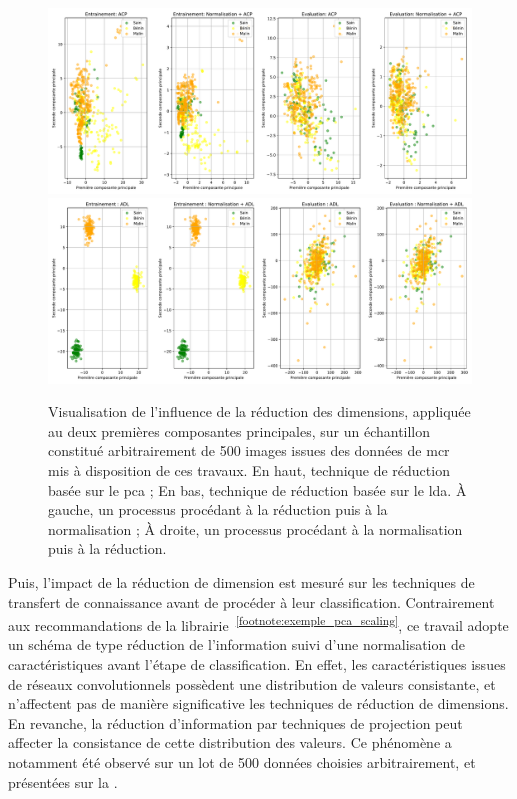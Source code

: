 \begin{figure}[H]
    \centering
    \includegraphics[width=\linewidth]{contents/chapter_5/resources/visualisation_scaling_PCA.pdf}
    \includegraphics[width=\linewidth]{contents/chapter_5/resources/visualisation_scaling_LDA.pdf}
    \caption{Visualisation de l'influence de la réduction des dimensions, appliquée au deux premières composantes principales, sur un échantillon constitué arbitrairement de 500 images issues des données de \gls{mcr} mis à disposition de ces travaux. En haut, technique de réduction basée sur le \gls{pca} ; En bas, technique de réduction basée sur le \gls{lda}. À gauche, un processus procédant à la réduction puis à la normalisation ; À droite, un processus procédant à la normalisation puis à la réduction.}
    \label{fig:visualisation_scaling_reduction}
\end{figure}\par

Puis, l'impact de la réduction de dimension est mesuré sur les techniques de transfert de connaissance avant de procéder à leur classification. Contrairement aux recommandations de la librairie~\textsuperscript{\ref{footnote:exemple_pca_scaling}}, ce travail adopte un schéma de type réduction de l'information suivi d'une normalisation de caractéristiques avant l'étape de classification. En effet, les caractéristiques issues de réseaux convolutionnels possèdent une distribution de valeurs consistante, et n'affectent pas de manière significative les techniques de réduction de dimensions. En revanche, la réduction d'information par techniques de projection peut affecter la consistance de cette distribution des valeurs. Ce phénomène a notamment été observé sur un lot de 500 données choisies arbitrairement, et présentées sur la .\par

